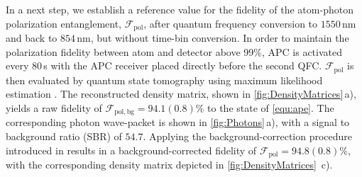 \documentclass[reprint, superscriptaddress, longbibliography, floatfix, twocolumn, nofootinbib, amsmath, amssymb, aps, showkeys]{revtex4-2}
\newcommand{\CH}[1]{{\textbf{\color{violet}[#1]}}}
\newcommand{\JE}[1]{{\textbf{\color{blue}[#1]}}}
\begin{document}
In a next step, we establish a reference value for the fidelity of the atom-photon polarization entanglement, $\mathcal{F}_\mathrm{pol}$, after quantum frequency conversion to $1550\,$nm and back to $854\,$nm, but without time-bin conversion. In order to maintain the polarization fidelity between atom and detector above 99\%, APC is activated every $80\,$s with the APC receiver placed directly before the second QFC. $\mathcal{F}_\mathrm{pol}$ is then evaluated by quantum state tomography using maximum likelihood estimation \cite{James_2001, Bock_2018}. The reconstructed density matrix, shown in \autoref{fig:DensityMatrices}$\,$a), yields a raw fidelity of $\mathcal{F}_\mathrm{pol,bg}=94.1(0.8)\%$ to the state of \autoref{equ:ape}. The corresponding photon wave-packet is shown in \autoref{fig:Photons}\,a), with a signal to background ratio (SBR) of $54.7$. Applying the background-correction procedure introduced in \cite{Bock_2018} results in a background-corrected fidelity of $\mathcal{F}_\mathrm{pol}=94.8(0.8)\%$, with the corresponding density matrix depicted in \autoref{fig:DensityMatrices}~c).

\end{document}
